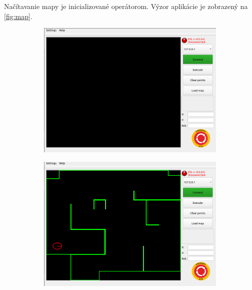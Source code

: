 Načítavanie mapy je inicializované operátorom. Výzor aplikácie je zobrazený na \ref{fig:map}.

\begin{figure}[!htbp]
	\centering
	\begin{subfigure}{0.49\textwidth}
		\includegraphics[width=\textwidth]{img/supervisor_view.png}
	\end{subfigure}
	\hfill
	\begin{subfigure}{0.49\textwidth}
		\includegraphics[width=\textwidth]{img/supervisor_loaded_map.png}
	\end{subfigure}


\end{figure}
